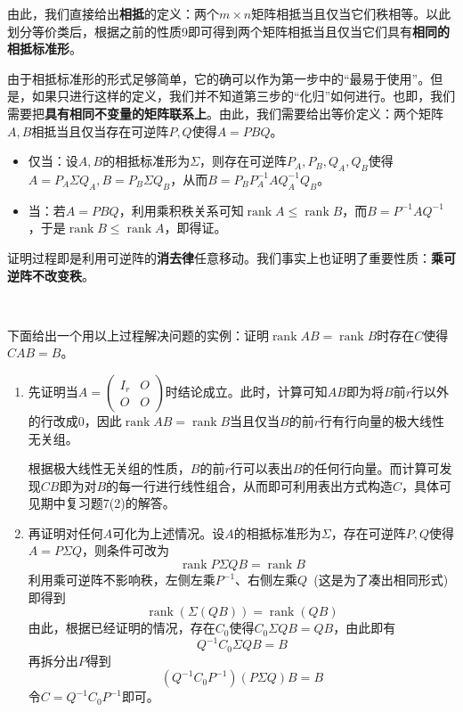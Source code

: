 \documentclass[a4paper,UTF8,fontset=windows]{ctexart}
\DeclareMathOperator{\rank}{rank}
\newcommand*{\note}{\noindent *}
\begin{document}
由此，我们直接给出\textbf{相抵}的定义：两个$m\times n$矩阵相抵当且仅当它们秩相等。以此划分等价类后，根据之前的性质9即可得到两个矩阵相抵当且仅当它们具有\textbf{相同的相抵标准形}。

由于相抵标准形的形式足够简单，它的确可以作为第一步中的``最易于使用''。但是，如果只进行这样的定义，我们并不知道第三步的``化归''如何进行。也即，我们需要把\textbf{具有相同不变量的矩阵联系上}。由此，我们需要给出等价定义：两个矩阵$A,B$相抵当且仅当存在可逆阵$P,Q$使得$A=PBQ$。

\begin{itemize}
    \item 仅当：设$A,B$的相抵标准形为$\Sigma$，则存在可逆阵$P_A,P_B,Q_A,Q_B$使得$A=P_A\Sigma Q_A,B=P_B\Sigma Q_B$，从而$B=P_BP_A^{-1}AQ_A^{-1}Q_B$。
    \item 当：若$A=PBQ$，利用乘积秩关系可知$\rank A\le\rank B$，而$B=P^{-1}AQ^{-1}$，于是$\rank B\le\rank A$，即得证。
\end{itemize}

\note 证明过程即是利用可逆阵的\textbf{消去律}任意移动。我们事实上也证明了重要性质：\textbf{乘可逆阵不改变秩}。

\

下面给出一个用以上过程解决问题的实例：证明$\rank AB=\rank B$时存在$C$使得$CAB=B$。

\begin{enumerate}
    \item 先证明当$A=\begin{pmatrix}I_r&O\\O&O\end{pmatrix}$时结论成立。此时，计算可知$AB$即为将$B$前$r$行以外的行改成0，因此$\rank AB=\rank B$当且仅当$B$的前$r$行有行向量的极大线性无关组。
    
    根据极大线性无关组的性质，$B$的前$r$行可以表出$B$的任何行向量。而计算可发现$CB$即为对$B$的每一行进行线性组合，从而即可利用表出方式构造$C$，具体可见期中复习题7(2)的解答。

    \item 再证明对任何$A$可化为上述情况。设$A$的相抵标准形为$\Sigma$，存在可逆阵$P,Q$使得$A=P\Sigma Q$，则条件可改为
    $$\rank P\Sigma QB=\rank B$$
    利用乘可逆阵不影响秩，左侧左乘$P^{-1}$、右侧左乘$Q$\ (这是为了凑出相同形式)即得到
    $$\rank(\Sigma(QB))=\rank(QB)$$
    由此，根据已经证明的情况，存在$C_0$使得$C_0\Sigma QB=QB$，由此即有
    $$Q^{-1}C_0\Sigma QB=B$$
    再拆分出$P$得到
    $$(Q^{-1}C_0P^{-1})(P\Sigma Q)B=B$$
    令$C=Q^{-1}C_0P^{-1}$即可。
\end{enumerate}
\end{document}
